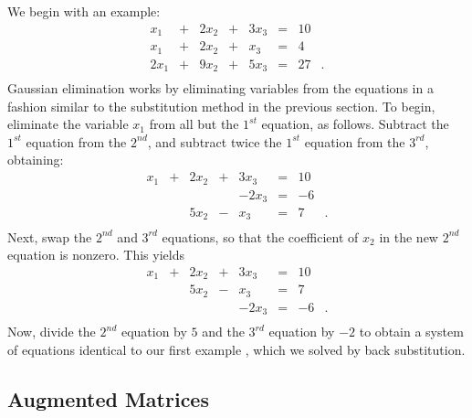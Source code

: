 We begin with an example:
\begin{equation}
\begin{array}{rcrcrcrl}
  x_1 & + & 2x_2 & + & 3x_3 & = &  10  & \\
  x_1 & + & 2x_2 & + &  x_3 & = &   4  & \\
 2x_1 & + & 9x_2 & + & 5x_3 & = &  27  & .\\
\end{array}
\end{equation}
Gaussian elimination works by eliminating variables from the
equations in a fashion similar to the substitution method in the
previous section.  To begin, eliminate the variable $x_1$ from
all but the $1^{st}$ equation, as follows.  Subtract the
$1^{st}$ equation from the $2^{nd}$, and subtract twice the
$1^{st}$ equation from the $3^{rd}$, obtaining:
\begin{equation}
\begin{array}{rcrcrcrl}
  x_1 & + & 2x_2 & + & 3x_3 & = &  10  & \\
      &   &      &   &-2x_3 & = &  -6  & \\
      &   & 5x_2 & - &  x_3 & = &   7  & .\\
\end{array}
\end{equation}
Next, swap the $2^{nd}$ and $3^{rd}$ equations, so that
the coefficient of $x_2$ in the new $2^{nd}$ equation is nonzero.
This yields
\begin{equation}
\begin{array}{rcrcrcrl}
  x_1 & + & 2x_2 & + & 3x_3 & = &  10  & \\
      &   & 5x_2 & - &  x_3 & = &   7  & \\
      &   &      &   &-2x_3 & = &  -6  & .\\
\end{array}
\end{equation}
Now, divide the $2^{nd}$ equation by $5$ and the $3^{rd}$
equation by $-2$ to obtain a system of equations identical to
our first example , which we solved by back
substitution.


\subsection*{Augmented Matrices}

